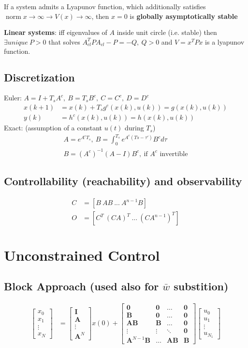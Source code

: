 \documentclass[landscape,a4paper,8pt]{scrartcl}
\newcommand\vA{\bm{A}}
\newcommand\vB{\bm{B}}
\newcommand\vI{\bm{I}}
\newcommand{\Me}[1]{\begin{bmatrix}#1\end{bmatrix}} %
\DeclareMathOperator\norm{norm}
\begin{document}
\begin{multicols*}{3}
If a system admits a Lyapunov function, which additionally satisfies $\norm{x}\to \infty \rightarrow V(x)\to \infty$, then $x=0$ is \textbf{globally asymptotically stable}


\textbf{Linear systems}: iff eigenvalues of $A$ inside unit circle (i.e. stable) then $\exists unique \ P>0$ that solves $A_{cl}^TPA_{cl}-P = -Q,\ Q > 0$ and $V = x^TPx$ is a lyapunov function.

\subsection{Discretization}
Euler: $A = I + T_s A^c ,\ B = T_s B^c ,\ C = C^c ,\ D = D^c $
\begin{align*}
x(k + 1) &= x(k) + T_sg^c(x(k),u(k)) = g(x(k),u(k)) \\ 
y(k) &= h^c(x(k),u(k)) = h(x(k),u(k))
\end{align*}
Exact: (assumption of a constant $u(t)$ during $T_s$)
\begin{align*}
A = e^{A^cT_s},\ B = \int_0^{T_s} e^{A^c(Ts-\tau')}B^cd\tau \\
B=(A^c)^{-1}(A-I)B^c,\ \text{if $A^c$ invertible}
\end{align*}

\subsection{Controllability (reachability) and observability}
\begin{align*}
C &= [B \ AB \ ... \ A^{n-1}B] \\
O &= [C^T \ (CA)^T \ ... \ (CA^{n-1})^T]
\end{align*}

\section{Unconstrained Control}
\subsection{Block Approach (used also for $\bar w$ substition)}
\begin{align*}
		\Me{x_0 \\ x_1 \\ \vdots \\ x_N } & = \Me{\vI \\ \vA \\ \vdots \\ \vA^N}x(0) + \Me{\bm 0 & \bm 0 & \dots & \bm 0 \\ \vB & \bm 0 & \dots & \bm 0 \\ \vA\vB & \vB & \dots & \bm 0 \\ \vdots & \vdots & \ddots & \bm 0 \\ \vA^{N-1}\vB & \dots & \vA\vB & \vB}\Me{u_0 \\ u_1 \\ \vdots \\ u_{N_1}}
\end{align*}


\end{multicols*}
\end{document}
